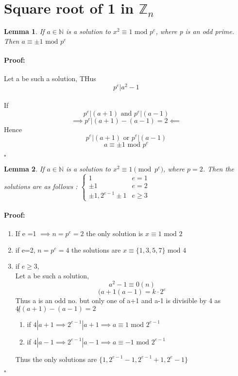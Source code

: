 \documentclass{report}
\newtheorem{lemma}{Lemma}[section]
\newcommand{\n}{\mathbb{N}}
\newcommand{\z}{\mathbb{Z}}
\renewenvironment{proof}{\paragraph{Proof:}}{\hfill$\square$}
\begin{document}
\section{Square root of 1 in $\z_n$}
\begin{lemma}
    If $a \in \n $ is a solution to $x^2\equiv 1 \textrm{ mod $p^e$}$, where p is an odd prime. Then $a \equiv \pm 1 \textrm{ mod $p^e$}$ 
\end{lemma}
\begin{proof}
    Let a be such a solution, THus $$p^e|a^2-1$$\\
    
   If $$p^e|(a+1)  \textrm{ and } p^e|(a-1)$$
   $$\implies p^e|(a+1)-(a-1)=2 \impliedby$$
   Hence $$p^e|(a+1)  \textrm{ or } p^e|(a-1)$$
   $$a\equiv \pm 1 \textrm{ mod $p^e$}$$
   
\end{proof}
\begin{lemma}
    If $a \in \mathbb{N}$ is a solution to $x^2\equiv 1 \pmod{p^e}$, where $p = 2$. Then the solutions are as follows :
    $
    \begin{cases}
            1 & e=1\\
            \pm 1 & e=2\\
            \pm 1, 2^{e-1}\pm1 & e\geq 3
    \end{cases}
    $
\end{lemma}
\begin{proof}
    \begin{enumerate}
        \item If e =1 $\implies n=p^e=2$
           the only solution is $x \equiv 1 \textrm{ mod 2}$
        \item if e=2, $n=p^e=4$
        the solutions are $x\equiv \{ 1,3,5,7\} \textrm{ mod 4}$
        \item if $e\geq 3$,\\
         Let a be such a solution,$$a^2-1\equiv 0 (n)$$
         $$(a+1(a-1)= k\cdot2^e$$
         Thus a is an odd no.
         but only one of a+1 and a-1 is divisible by 4 as $4\not| (a+1)-(a-1)=2$ 
\begin{enumerate}
    \item if $4|a+1 \implies 2^{e-1}|a+1 \implies a \equiv 1\textrm{ mod $2^{e-1}$} $
    \item if $4|a-1 \implies 2^{e-1}|a-1 \implies a \equiv -1\textrm{ mod $2^{e-1}$} $ 
\end{enumerate}
Thus the only solutions are $\{1,2^{e-1}-1,2^{e-1}+1,2^e-1\}$
        
    \end{enumerate}
\end{proof}
\end{document}
